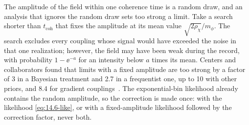 The amplitude of the field within one coherence time is a random draw, and an analysis that ignores the random draw sets too strong a limit. Take a search shorter than $t_{\mathrm{coh}}$ that fixes the amplitude at its mean value $\sqrt{2\rho_\chi}/m_\phi$. The search excludes every coupling whose signal would have exceeded the noise in that one realization; however, the field may have been weak during the record, with probability $1 - \ee^{-a}$ for an intensity below $a$ times its mean. Centers and collaborators found that limits with a fixed amplitude are too strong by a factor of 3 in a Bayesian treatment and 2.7 in a frequentist one, up to 10 with other priors, and 8.4 for gradient couplings~\cite[Eq.~(7)]{centers2021stochastic}. The exponential-bin likelihood already contains the random amplitude, so the correction is made once: with the likelihood \cref{eq:14.6-like}, or with a fixed-amplitude likelihood followed by the correction factor, never both.


